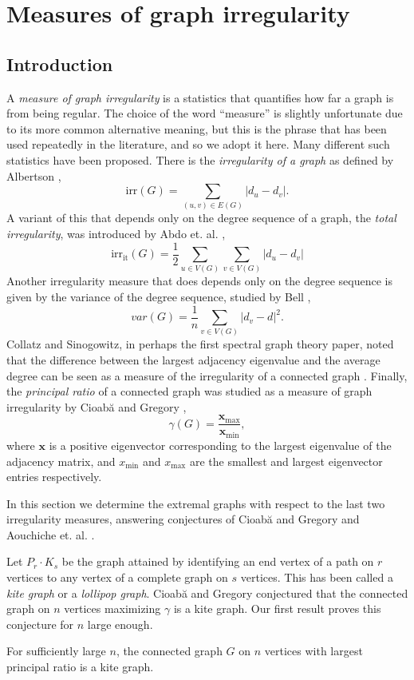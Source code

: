 \chapter{Measures of graph irregularity}
\section{Introduction}

A \textit{measure of graph irregularity} is a  statistics that quantifies how far a graph is
from being regular.  The choice of the word ``measure'' is slightly unfortunate due to its
more common alternative meaning, but this is the phrase that has been used repeatedly in the
literature, and so we adopt it here.  Many different such statistics have been proposed.
There is the \textit{irregularity of a graph} as defined by Albertson \cite{Albertson1997},
\[ \textrm{irr}(G) = \sum_{(u,v) \in E(G)} \left| d_u - d_v \right| .\]
A variant of this that depends only on the degree sequence of a graph,
the \textit{total irregularity}, was introduced by Abdo et. al. \cite{Abdo2014},
\[ \textrm{irr}_{\textrm{it}}(G) = \frac{1}{2} \sum_{u \in V(G)} \sum_{v \in V(G)} \left| d_u - d_v\right|\]
Another irregularity measure that does depends only on the degree sequence is given by the
variance of the degree sequence, studied by Bell \cite{Bell1992},
\[var(G) = \frac{1}{n} \sum_{v\in V(G)} \left| d_v - d \right|^2 . \]
Collatz and Sinogowitz, in perhaps the first spectral graph theory paper, noted
that the difference between the largest adjacency eigenvalue and the average degree
can be seen as a measure of the irregularity of a connected graph \cite{CollatzSinogowitz1957}.
Finally, the \textit{principal ratio} of a connected graph was studied as a
measure of graph irregularity by Cioab\u{a} and Gregory \cite{CioabaGregory2007},
\[ \gamma(G) = \frac{\mathbf{x}_{\text{max}}}{\mathbf{x}_{\text{min}}},\]
where $\mathbf{x}$ is a positive eigenvector corresponding to the
largest eigenvalue of the adjacency matrix, and
$x_{\text{min}}$ and $x_{\text{max}}$ are the smallest and largest eigenvector
entries respectively.

In this section we determine the extremal graphs
with respect to the last two irregularity measures,
answering conjectures of Cioab\u{a} and Gregory \cite{CioabaGregory2007}
and Aouchiche et. al. \cite{AouchicheEtAl2008}.


Let $P_r \cdot K_s$ be the graph attained by identifying an end vertex
of a path on $r$ vertices to any vertex of a complete graph
on $s$ vertices.  This has been called a \textit{kite graph} or a
\textit{lollipop graph}.  Cioab\u{a} and Gregory \cite{CioabaGregory2007}
conjectured that the connected graph on $n$ vertices maximizing $\gamma$
is a kite graph.  Our first result proves this conjecture for $n$ large
enough.
\begin{theorem}\label{main_theorem}
  For sufficiently large $n$, the connected graph $G$ on $n$
  vertices with largest principal ratio is a kite graph.
\end{theorem}


